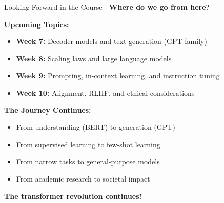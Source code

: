 \documentclass[aspectratio=169]{beamer}
\begin{document}
\begin{frame}[shrink=10]{Looking Forward in the Course 🔮}
\textbf{Where do we go from here?}

\vspace{1em}

\textbf{Upcoming Topics:}
\begin{itemize}\setlength{\itemsep}{0pt}
    \item \textbf{Week 7:} Decoder models and text generation (GPT family)
    \item \textbf{Week 8:} Scaling laws and large language models
    \item \textbf{Week 9:} Prompting, in-context learning, and instruction tuning
    \item \textbf{Week 10:} Alignment, RLHF, and ethical considerations
\end{itemize}

\vspace{1em}

\textbf{The Journey Continues:}
\begin{itemize}\setlength{\itemsep}{0pt}
    \item From understanding (BERT) to generation (GPT)
    \item From supervised learning to few-shot learning
    \item From narrow tasks to general-purpose models
    \item From academic research to societal impact
\end{itemize}

\vspace{1em}

\begin{center}
\Large
\textbf{The transformer revolution continues! 🚀}
\end{center}
\end{frame}
\end{document}
